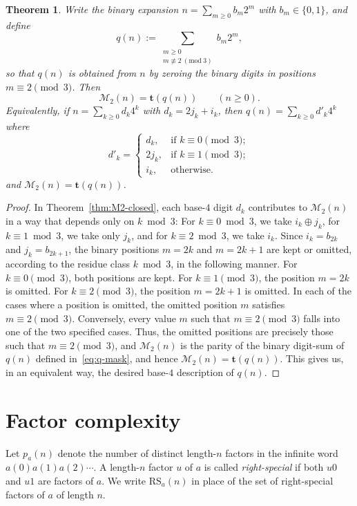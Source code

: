 \documentclass[12pt,reqno]{article}
\theoremstyle{plain}
\newtheorem{theorem}{Theorem}
\theoremstyle{definition}
\theoremstyle{remark}
\begin{document}
\begin{theorem}\label{thm:M2-tq} 
Write the binary expansion $n=\sum_{m\ge 0} b_m 2^m$ with $b_m\in\{0,1\}$, and define
\begin{equation}\label{eq:q-mask} 
 q(n) := \sum_{\substack{m \ge 0 \\ m \not\equiv 2\ (\mathrm{mod}\ 3)}} b_m 2^m,
\end{equation}
 so that $q(n)$ is obtained from $n$ by zeroing the binary digits in positions
 $m\equiv 2\pmod 3$. Then
$$ \mathcal{M}_{2}(n)=\mathbf{t}(q(n))\qquad(n\ge 0). $$
Equivalently, if $n=\sum_{k\ge 0} d_k 4^k$ with $d_k=2j_k+i_k$, then $q(n)=\sum_{k\ge 0} d'_k 4^k$ where
\[
 d'_k= 
 \begin{cases}
 d_k, & \text{if } k\equiv 0\pmod 3;\\
 2j_k, & \text{if } k\equiv 1\pmod 3;\\
 i_k, & \text{otherwise.}
 \end{cases}
\]
and $\mathcal{M}_{2}(n)=\mathbf{t}(q(n))$.
\end{theorem}

\begin{proof}
 In Theorem~\ref{thm:M2-closed}, each base-$4$ digit $d_k$ contributes to $\mathcal{M}_{2}(n)$ in a way that depends only on 
 $k\bmod 3$: For $k \equiv 0 \bmod 3$, we take $i_k \oplus j_k$, for $k\equiv 1 \bmod 3$, we take only $j_k$, and for $k \equiv 2 
 \bmod 3$, we take $i_k$. Since $i_k=b_{2k}$ and $j_k=b_{2k+1}$, the binary positions $m=2k$ and $m = 2 k + 1$ are kept or 
 omitted, according to the residue class $k \bmod 3$, in the following manner. For $k\equiv 0 \pmod 3$, both positions are kept. For 
 $k\equiv 1\pmod 3$, the position $m=2k$ is omitted. For $k \equiv 2 \pmod 3$, the position $m = 2k+1$ is omitted. 
 In each of the cases where a position is omitted, 
 the omitted position $m$ satisfies $m \equiv 2 \pmod 3$. Conversely, every value $m$ such that 
 $m\equiv 2\pmod 3$ falls into one of the two specified cases. Thus, the omitted positions are precisely those     such that $m \equiv 2  
  \pmod 3$, and $\mathcal{M}_{2}(n)$ is the parity of the binary digit-sum of 
 $q(n)$ defined in~\eqref{eq:q-mask}, and hence $\mathcal{M}_{2}(n)=\mathbf{t}(q(n))$. This gives us, in an equivalent 
 way, the desired 
 base-$4$ description of $q(n)$. 
\end{proof}

\section{Factor complexity}\label{sec:complexity}
 Let $p_a(n)$ denote the number of distinct length-$n$ factors in the infinite word $a(0)a(1)a(2)\cdots$. A length-$n$ factor $u$ of $a$ is 
 called \emph{right-special} if both
 $u0$ and $u1$ are factors of $a$. We write $\mathrm{RS}_a(n)$ in place of the set of right-special
 factors of $a$ of length $n$.
\end{document}
